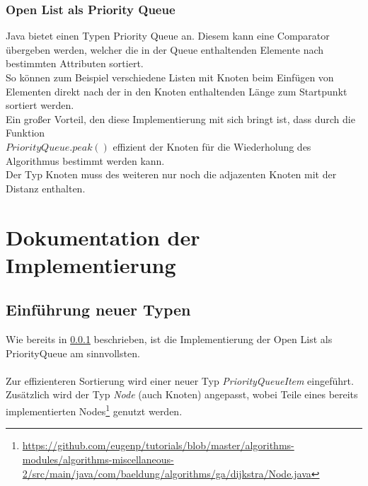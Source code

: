 \documentclass[a4paper]{article}
\begin{document}
\subsubsection{Open List als Priority Queue} \label{priorityQueueSection}

Java bietet einen Typen Priority Queue an. Diesem kann eine Comparator übergeben werden, welcher die in der Queue enthaltenden Elemente nach bestimmten Attributen sortiert.\\
So können zum Beispiel verschiedene Listen mit Knoten beim Einfügen von Elementen direkt nach der in den Knoten enthaltenden Länge zum Startpunkt sortiert werden.\\
Ein großer Vorteil, den diese Implementierung mit sich bringt ist, dass durch die Funktion\\$PriorityQueue.peak()$ effizient der Knoten für die Wiederholung des Algorithmus bestimmt werden kann.\\
Der Typ Knoten muss des weiteren nur noch die adjazenten Knoten mit der Distanz enthalten.\\

\section{Dokumentation der Implementierung}

\subsection{Einführung neuer Typen}

Wie bereits in \ref{priorityQueueSection} beschrieben, ist die Implementierung der Open List als PriorityQueue am sinnvollsten.\\\\
Zur effizienteren Sortierung wird einer neuer Typ \textit{PriorityQueueItem} eingeführt. Zusätzlich wird der Typ \textit{Node} (auch Knoten) angepasst, wobei Teile eines bereits implementierten Nodes\footnote{\url{https://github.com/eugenp/tutorials/blob/master/algorithms-modules/algorithms-miscellaneous-2/src/main/java/com/baeldung/algorithms/ga/dijkstra/Node.java}} genutzt werden.\\
\end{document}
